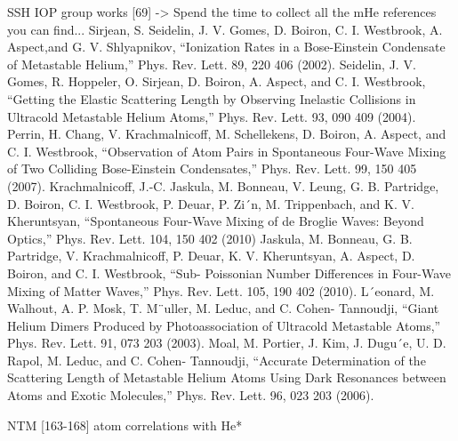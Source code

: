 		SSH IOP group works [69] -> Spend the time to collect all the mHe references you can find...
	Sirjean, S.
	Seidelin, J.
	V.
	Gomes, D.
	Boiron, C.
	I.
	Westbrook, A.
	Aspect,and G.
	V.
	Shlyapnikov, ``Ionization Rates in a Bose-Einstein Condensate of Metastable Helium,'' Phys.
	Rev.
	Lett.
	89, 220 406 (2002).
	Seidelin, J.
	V.
	Gomes, R.
	Hoppeler, O.
	Sirjean, D.
	Boiron, A.
	Aspect, and C.
	I.
	Westbrook, ``Getting the Elastic Scattering Length by Observing Inelastic Collisions in Ultracold Metastable Helium Atoms,'' Phys.
	Rev.
	Lett.		93, 090 409 (2004).
	Perrin, H.
	Chang, V.
	Krachmalnicoff, M.
	Schellekens, D.
	Boiron, A.
	Aspect,		and C.
	I.
	Westbrook, ``Observation of Atom Pairs in Spontaneous Four-Wave		Mixing of Two Colliding Bose-Einstein Condensates,'' Phys.
	Rev.
	Lett.
	99,		150 405 (2007).
	Krachmalnicoff, J.-C.
	Jaskula, M.
	Bonneau, V.
	Leung, G.
	B.
	Partridge,		D.
	Boiron, C.
	I.
	Westbrook, P.
	Deuar, P.
	Zi´n, M.
	Trippenbach, and K.
	V.		Kheruntsyan, ``Spontaneous Four-Wave Mixing of de Broglie Waves: Beyond		Optics,'' Phys.
	Rev.
	Lett.
	104, 150 402 (2010)
	Jaskula, M.
	Bonneau, G.
	B.
	Partridge, V.
	Krachmalnicoff, P.
	Deuar,		K.
	V.
	Kheruntsyan, A.
	Aspect, D.
	Boiron, and C.
	I.
	Westbrook, ``Sub-		Poissonian Number Differences in Four-Wave Mixing of Matter Waves,'' Phys.		Rev.
	Lett.
	105, 190 402 (2010).
	L´eonard, M.
	Walhout, A.
	P.
	Mosk, T.
	M¨uller, M.
	Leduc, and C.
	Cohen-		Tannoudji, ``Giant Helium Dimers Produced by Photoassociation of Ultracold		Metastable Atoms,'' Phys.
	Rev.
	Lett.
	91, 073 203 (2003).
	Moal, M.
	Portier, J.
	Kim, J.
	Dugu´e, U.
	D.
	Rapol, M.
	Leduc, and C.
	Cohen-		Tannoudji, ``Accurate Determination of the Scattering Length of Metastable		Helium Atoms Using Dark Resonances between Atoms and Exotic Molecules,''		Phys.
	Rev.
	Lett.
	96, 023 203 (2006).
		
		NTM [163-168] atom correlations with He* 

